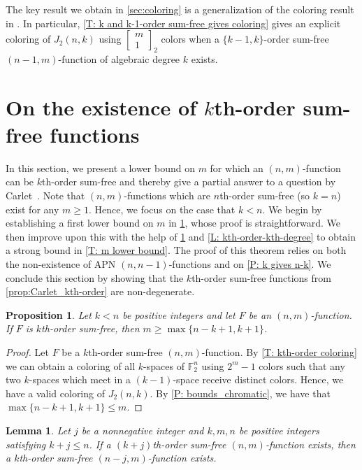 \documentclass[12pt]{article}
\newtheorem{lem}[thm]{Lemma}
\newtheorem{prop}[thm]{Proposition}
\theoremstyle{definition}
\newcommand{\Gauss}[2]{{\begin{bmatrix} #1 \\ #2 \end{bmatrix}_2}}
\newcommand{\F}{\mathbb F}
\begin{document}
The key result we obtain in \cref{sec:coloring} is a generalization of the coloring result in \cite{heering2025lineparallelismspgn2preparatalike}.  In particular, \cref{T: k and k-1-order sum-free gives coloring} gives an explicit coloring of $J_2(n, k)$ using $\Gauss{m}{1}$ colors when a $\{k-1, k\}$-order sum-free $(n-1, m)$-function of algebraic degree $k$ exists.

\section{On the existence of $k$th-order sum-free functions}
\label{sec:sum-free_functions}

In this section, we present a lower bound on $m$ for which an $(n,m)$-function can be $k$th-order sum-free and thereby give a partial answer to a question by Carlet~\cite{carlet2025generalizations}. Note that $(n, m)$-functions which are $n$th-order sum-free (so $k=n$) exist for any $m \geq 1$. Hence, we focus on the case that $k < n$. We begin by establishing a first lower bound on $m$ in \cref{prop:m ge n-k+1}, whose proof is straightforward. We then improve upon this with the help of \cref{L: n to n-j} and \cref{L: kth-order-kth-degree} to obtain a strong bound in \cref{T: m lower bound}. The proof of this theorem relies on both the non-existence of APN $(n, n-1)$-functions and on \cref{P: k gives n-k}. We conclude this section by showing that the $k$th-order sum-free functions from \cref{prop:Carlet_kth-order} are non-degenerate.

\begin{prop}
\label{prop:m ge n-k+1}
    Let $k<n$ be positive integers and let $F$ be an $(n,m)$-function. If $F$ is $k$th-order sum-free, then $m \ge \max\{n-k+1, k+1\}$. 
\end{prop}
\begin{proof}
    Let $F$ be a $k$th-order sum-free $(n, m)$-function. By \cref{T: kth-order coloring} we can obtain a coloring of all $k$-spaces of $\F_{2}^n$ using $2^m-1$ colors such that any two $k$-spaces which meet in a $(k-1)$-space receive distinct colors. Hence, we have a valid coloring of $J_2(n, k)$. By \cref{P: bounds_chromatic}, we have that $\max\{ n-k+1, k+1\}\leq m$. 
\end{proof}


\begin{lem}\label{L: n to n-j}
Let $j$ be a nonnegative integer and $k, m, n$ be positive integers satisfying $k+j \le n$. If a $(k+j)$th-order sum-free $(n, m)$-function exists, then a $k$th-order sum-free $(n-j, m)$-function exists.
\end{lem}
\end{document}

